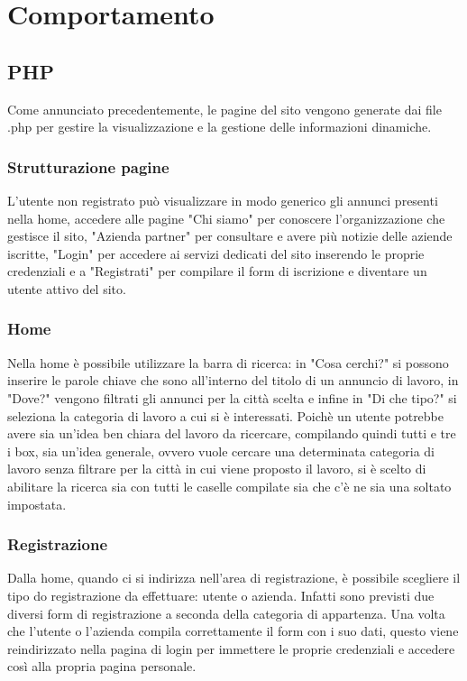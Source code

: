 \section{Comportamento}
	\subsection{PHP}
	Come annunciato precedentemente, le pagine del sito vengono generate dai file .php per gestire la visualizzazione e la gestione delle informazioni dinamiche.
		\subsubsection{Strutturazione pagine}
		L'utente non registrato può visualizzare in modo generico gli annunci presenti nella home, accedere alle pagine "Chi siamo" per conoscere l'organizzazione che gestisce il sito, "Azienda partner" per consultare e avere più notizie delle aziende iscritte, "Login" per accedere ai servizi dedicati del sito inserendo le proprie credenziali e a "Registrati" per compilare il form di iscrizione e diventare un utente attivo del sito.
		\subsubsection{Home}
		Nella home è possibile utilizzare la barra di ricerca: in "Cosa cerchi?" si possono inserire le parole chiave che sono all'interno del titolo di un annuncio di lavoro, in "Dove?" vengono filtrati gli annunci per la città scelta e infine in "Di che tipo?" si seleziona la categoria di lavoro a cui si è interessati.
		Poichè un utente potrebbe avere sia un'idea ben chiara del lavoro da ricercare, compilando quindi tutti e tre i box, sia un'idea generale, ovvero vuole cercare una determinata categoria di lavoro senza filtrare per la città in cui viene proposto il lavoro, si è scelto di abilitare la ricerca sia con tutti le caselle compilate sia che c'è ne sia una soltato impostata.
		\subsubsection{Registrazione}
		Dalla home, quando ci si indirizza nell'area di registrazione, è possibile scegliere il tipo do registrazione da effettuare: utente o azienda. Infatti sono previsti due diversi form di registrazione a seconda della categoria di appartenza. Una volta che l'utente o l'azienda compila correttamente il form con i suo dati, questo viene reindirizzato nella pagina di login per immettere le proprie credenziali e accedere così alla propria pagina personale.

